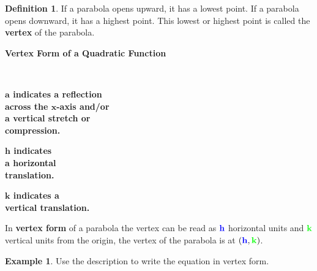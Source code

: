 \documentclass{report}
\theoremstyle{definition}
\newtheorem{example}{\bf Example}
\newtheorem{definition}{\bf Definition}[section]
\begin{document}
\begin{definition}
If a parabola opens upward, it has a lowest point. If a parabola opens downward, it has a highest point. This lowest or highest point is called the \textbf{vertex} of the parabola.
\end{definition}

\vspace{-0.5cm}

\begin{center}
\textbf{Vertex Form of a Quadratic Function}\\

\vspace{0.15cm}

\large{}\normalsize\\

\hspace{3cm}
\begin{minipage}[t]{0.3\linewidth}
\color{red}
\textbf{$\mathbf{a}$ indicates a reflection\\
across the $\mathbf{x}$-axis and/or\\
a vertical stretch or\\ compression.
}
\color{black}
\end{minipage}
\begin{minipage}[t]{0.2\linewidth}
\color{blue}
\textbf{
\noindent$\mathbf{h}$ indicates\\ a horizontal \\ translation.
}
\color{black}
\end{minipage}
\begin{minipage}[t]{0.3\linewidth}
\color{green}
\textbf{
$\mathbf{k}$ indicates a \\ vertical translation.
}
\color{black}
\end{minipage}
\end{center}

\noindent In \textbf{vertex form} of a parabola the vertex can be read as $\color{blue}\mathbf{h}\color{black}$ horizontal units and $\mathbf{\color{green}k\color{black}}$ vertical units from the origin, the vertex of the parabola is at $\mathbf{(\color{blue}h\color{black},\color{green}k\color{black})}$.

 \begin{example}
Use the description to write the equation in vertex form.
 \end{example}
 
\end{document}
